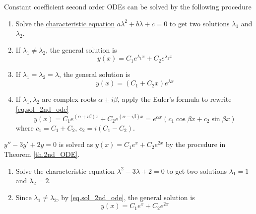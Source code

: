 \begin{theorem}[]\label{th.2nd_ODE}
    Constant coefficient second order ODEs can be solved by the following procedure
    \begin{enumerate}
        \item Solve the \underline{characteristic equation} $a\lambda^2 +  b\lambda + c = 0$ to get two solutions $\lambda_1$ and $\lambda_2$.
        \item If $\lambda_1\neq\lambda_2$, the general solution is 
        \begin{equation}\label{eq.sol_2nd_ode}
            y(x)=C_1 e^{\lambda_1 x}+C_2 e^{\lambda_2 x}
        \end{equation}
        \item If $\lambda_1=\lambda_2=\lambda$, the general solution is 
        \begin{equation}\label{eq.sol_2nd_ode_eqroot}
            y(x)=(C_1 + C_2x) e^{\lambda x}
        \end{equation}
        \item If $\lambda_1, \lambda_2$ are complex roots $\alpha \pm i\beta$, apply the Euler's formula to rewrite \eqref{eq.sol_2nd_ode}
        \begin{equation}\label{eq.sol_2nd_ode_complex}
            y(x)=C_1 e^{(\alpha+i \beta) x}+C_2 e^{(\alpha-i \beta) x}=e^{\alpha x}\left(c_1 \cos \beta x+c_2 \sin \beta x\right)
        \end{equation}
        where $c_1=C_1+C_2$, $c_2=i(C_1-C_2)$.
    \end{enumerate}
\end{theorem}

\begin{example}[]
    $y'' - 3y' + 2y = 0$ is solved as $y(x)=C_1e^{x}+C_2e^{2x}$ by the procedure in Theorem \ref{th.2nd_ODE}.
    \begin{enumerate}
        \item Solve the characteristic equation $\lambda^2 - 3\lambda + 2 = 0$ to get two solutions $\lambda_1 = 1$ and $\lambda_2 = 2$.
        \item Since $\lambda_1\neq\lambda_2$, by \eqref{eq.sol_2nd_ode}, the general solution is 
        \begin{equation}
            y(x)=C_1 e^{x}+C_2 e^{2x}
        \end{equation}
    \end{enumerate}
\end{example}

